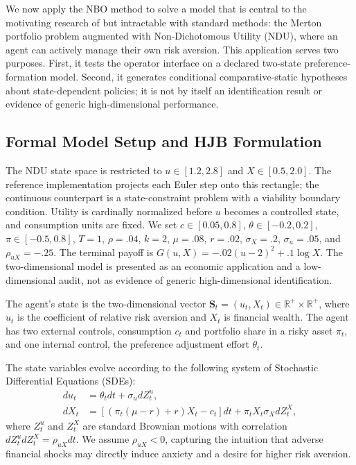 \documentclass[ecta]{econsocart}
\theoremstyle{plain}
\theoremstyle{remark}
\newcommand{\R}{\mathbb{R}}
\newcommand{\statevec}{\bm{S}}
\begin{document}
We now apply the NBO method to solve a model that is central to the motivating research of \cite{qi2025} but intractable with standard methods: the Merton portfolio problem augmented with Non-Dichotomous Utility (NDU), where an agent can actively manage their own risk aversion. This application serves two purposes. First, it tests the operator interface on a declared two-state preference-formation model. Second, it generates conditional comparative-static hypotheses about state-dependent policies; it is not by itself an identification result or evidence of generic high-dimensional performance.

\subsection{Formal Model Setup and HJB Formulation}
The NDU state space is restricted to $u\in[1.2,2.8]$ and $X\in[0.5,2.0]$. The reference implementation projects each Euler step onto this rectangle; the continuous counterpart is a state-constraint problem with a viability boundary condition. Utility is cardinally normalized before $u$ becomes a controlled state, and consumption units are fixed. We set $c\in[0.05,0.8]$, $\theta\in[-0.2,0.2]$, $\pi\in[-0.5,0.8]$, $T=1$, $\rho=.04$, $k=2$, $\mu=.08$, $r=.02$, $\sigma_X=.2$, $\sigma_u=.05$, and $\rho_{uX}=-.25$. The terminal payoff is $G(u,X)=-.02(u-2)^2+.1\log X$. The two-dimensional model is presented as an economic application and a low-dimensional audit, not as evidence of generic high-dimensional identification.


The agent's state is the two-dimensional vector $\statevec_t = (u_t, X_t) \in \R^+ \times \R^+$, where $u_t$ is the coefficient of relative risk aversion and $X_t$ is financial wealth. The agent has two external controls, consumption $c_t$ and portfolio share in a risky asset $\pi_t$, and one internal control, the preference adjustment effort $\theta_t$.

The state variables evolve according to the following system of Stochastic Differential Equations (SDEs):
\begin{align}
du_t &= \theta_t dt + \sigma_u dZ_t^u, \label{eq:ndu_u_sde}\\
dX_t &= \left[ (\pi_t (\mu-r) + r)X_t - c_t \right]dt + \pi_t X_t \sigma_X dZ_t^X, \label{eq:ndu_x_sde}
\end{align}
where $Z_t^u$ and $Z_t^X$ are standard Brownian motions with correlation $dZ_t^u dZ_t^X = \rho_{uX} dt$. We assume $\rho_{uX} < 0$, capturing the intuition that adverse financial shocks may directly induce anxiety and a desire for higher risk aversion.
\end{document}
